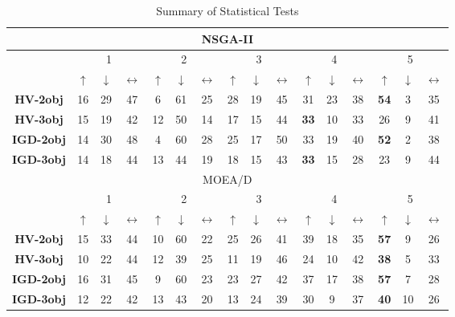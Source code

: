 \begin{table}[t]
\centering
\caption{Summary of Statistical Tests}
\label{tab:statistical_Tests}
\begin{tabular}{|c|c|c|c|c|c|c|c|c|c|c|c|c|c|c|c|}
\hline
\multicolumn{16}{|c|}{NSGA-II} \\ \hline
 & \multicolumn{3}{c|}{1} & \multicolumn{3}{c|}{2} & \multicolumn{3}{c|}{3} & \multicolumn{3}{c|}{4} & \multicolumn{3}{c|}{5} \\ \hline
 & $\uparrow$ & $\downarrow$ & $\longleftrightarrow$ & $\uparrow$ & $\downarrow$ & $\longleftrightarrow$ & $\uparrow$ & $\downarrow$ & $\longleftrightarrow$ & $\uparrow$ & $\downarrow$ & $\longleftrightarrow$ & $\uparrow$ & $\downarrow$ & $\longleftrightarrow$ \\ \hline
\textbf{HV-2obj} & 16 & 29 & 47 & 6 & 61 & 25 & 28 & 19 & 45 & 31 & 23 & 38 & \textbf{54} & 3 & 35 \\ \hline
\textbf{HV-3obj} & 15 & 19 & 42 & 12 & 50 & 14 & 17 & 15 & 44 & \textbf{33} & 10 & 33 & 26 & 9 & 41 \\ \hline
\textbf{IGD-2obj} & 14 & 30 & 48 & 4 & 60 & 28 & 25 & 17 & 50 & 33 & 19 & 40 & \textbf{52} & 2 & 38 \\ \hline
\textbf{IGD-3obj} & 14 & 18 & 44 & 13 & 44 & 19 & 18 & 15 & 43 & \textbf{33} & 15 & 28 & 23 & 9 & 44 \\ \hline

\hline
\hline
\multicolumn{16}{|c|}{MOEA/D} \\ \hline
 & \multicolumn{3}{c|}{1} & \multicolumn{3}{c|}{2} & \multicolumn{3}{c|}{3} & \multicolumn{3}{c|}{4} & \multicolumn{3}{c|}{5} \\ \hline
 & $\uparrow$ & $\downarrow$ & $\longleftrightarrow$ & $\uparrow$ & $\downarrow$ & $\longleftrightarrow$ & $\uparrow$ & $\downarrow$ & $\longleftrightarrow$ & $\uparrow$ & $\downarrow$ & $\longleftrightarrow$ & $\uparrow$ & $\downarrow$ & $\longleftrightarrow$ \\ \hline
\textbf{HV-2obj} & 15 & 33 & 44 & 10 & 60 & 22 & 25 & 26 & 41 & 39 & 18 & 35 & \textbf{57} & 9 & 26 \\ \hline
\textbf{HV-3obj} & 10 & 22 & 44 & 12 & 39 & 25 & 11 & 19 & 46 & 24 & 10 & 42 & \textbf{38} & 5 & 33 \\ \hline
\textbf{IGD-2obj} & 16 & 31 & 45 & 9 & 60 & 23 & 23 & 27 & 42 & 37 & 17 & 38 & \textbf{57} & 7 & 28 \\ \hline
\textbf{IGD-3obj} & 12 & 22 & 42 & 13 & 43 & 20 & 13 & 24 & 39 & 30 & 9 & 37 & \textbf{40} & 10 & 26 \\ \hline


\end{tabular}
\end{table}
